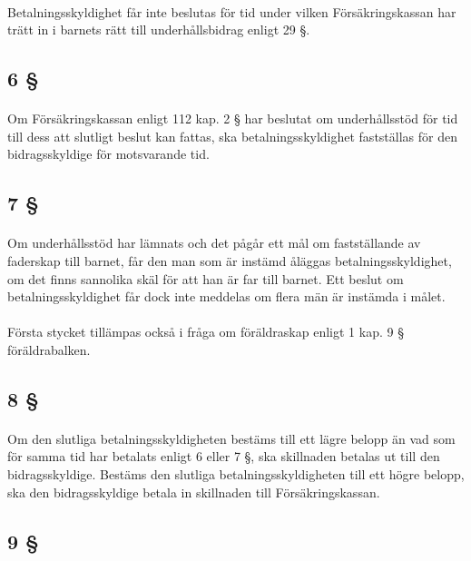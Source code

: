 \documentclass[a4paper,notitlepage,openany,10pt]{book}
\begin{document}
\paragraph*{}
Betalningsskyldighet får inte beslutas för tid under vilken Försäkringskassan har trätt in i barnets rätt till underhållsbidrag enligt 29 §.
\subsection*{6 §}
\paragraph*{}
Om Försäkringskassan enligt 112 kap. 2 § har beslutat om underhållsstöd för tid till dess att slutligt beslut kan fattas, ska betalningsskyldighet fastställas för den bidragsskyldige för motsvarande tid.
\subsection*{7 §}
\paragraph*{}
Om underhållsstöd har lämnats och det pågår ett mål om fastställande av faderskap till barnet, får den man som är instämd åläggas betalningsskyldighet, om det finns sannolika skäl för att han är far till barnet. Ett beslut om betalningsskyldighet får dock inte meddelas om flera män är instämda i målet.
\paragraph*{}
Första stycket tillämpas också i fråga om föräldraskap enligt 1 kap. 9 § föräldrabalken.
\subsection*{8 §}
\paragraph*{}
Om den slutliga betalningsskyldigheten bestäms till ett lägre belopp än vad som för samma tid har betalats enligt 6 eller 7 §, ska skillnaden betalas ut till den bidragsskyldige. Bestäms den slutliga betalningsskyldigheten till ett högre belopp, ska den bidragsskyldige betala in skillnaden till Försäkringskassan.
\subsection*{9 §}
\end{document}
